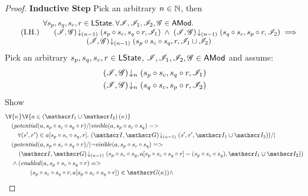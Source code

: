 \begin{lemma}
\begin{proof}
\noindent\textbf{Inductive Step} Pick an arbitrary $n \in \mathbb{N}$, then
%
\begin{equation}
	\tag{I.H.}
	\begin{array}{l}
		\forall s_p, s_q, s_c, r \in \textsf{LState}.\, \forall \mathscr{I}, \mathscr{I}_{1}, \mathscr{I}_{2}, \mathscr{G} \in \textsf{AMod}.\,\\
		\hspace*{0.5cm} \left(\mathscr{I}, \mathscr{G}\right) \!\downarrow_{(n-1)} \left(s_p \circ s_c, s_q \circ r, \mathscr{I}_{1}\right) \;\land\; \left(\mathscr{I}, \mathscr{G}\right) \!\downarrow_{(n-1)} \left(s_q \circ s_c, s_p \circ r, \mathscr{I}_{2}\right)
		\implies\\
		\hspace*{2cm} \left(\mathscr{I}, \mathscr{G}\right) \!\downarrow_{(n-1)} \left(s_p \circ s_c \circ s_q, r, \mathscr{I}_{1} \cup \mathscr{I}_{2}\right)
	\end{array}\label{LMC:IH}
\end{equation}
%
Pick an arbitrary $s_p, s_q, s_c, r \in \textsf{LState}$, $\mathscr{I}, \mathscr{I}_{1}, \mathscr{I}_{2}, \mathscr{G} \in \textsf{AMod}$ and assume:
%
\begin{align}
	& \left(\mathscr{I}, \mathscr{G}\right) \!\downarrow_{n} \left(s_p \circ s_c, s_q \circ r, \mathscr{I}_{1}\right) \label{LMC:Ass1}\\
	& \left(\mathscr{I}, \mathscr{G}\right) \!\downarrow_{n} \left(s_q \circ s_c, s_p \circ r, \mathscr{I}_{2}\right) \label{LMC:Ass2}
\end{align}
%
Show
%
\begin{align}
	& 
	\V{\ca{}}  \V{a \in \left(\lmod_{1} \cup \lmod_{2}\right)(\ca{})} \nonumber \\
  &\quad(\m{potential}(a,s_p \composeL s_c \composeL s_q \composeL r) /| \m{visible}(a,s_p \composeL s_c \composeL s_q)=> \nonumber \\
  &\qquad \for{(s', r') \in a[s_p \composeL s_c \composeL s_q , r]} \extendsAMUpto{\lmod, \gmod}{(n-1)}{s'}{r'}{\lmod_{1} \cup \lmod_{2}}) /| \label{LMC:Goal0}\\
%    
  &\quad(\m{potential}(a,s_p \composeL s_c \composeL s_q \composeL r) /| \neg \m{visible}(a,s_p \composeL s_c \composeL s_q) => \nonumber \\
  &\qquad \extendsAMUpto{\lmod, \gmod}{(n-1)}{s_p \composeL s_c \composeL s_q}{a[s_p \composeL s_c \composeL s_q \composeL r] - (s_p \composeL s_c \composeL s_q)}{\lmod_{1} \cup \lmod_{2}}) \label{LMC:Goal1}\\
%    
  &\quad\land(\m{enabled}(a,s_p \composeL s_c \composeL s_q \composeL r) => \nonumber\\
  &\qquad\qquad (s_p \composeL s_c \composeL s_q  \composeL r, a[s_p \composeL s_c \composeL s_q  \composeL r])\in \gmod(\ca{})) \land\label{LMC:Goal2}\\

\end{align}
\end{proof}
\end{lemma}
